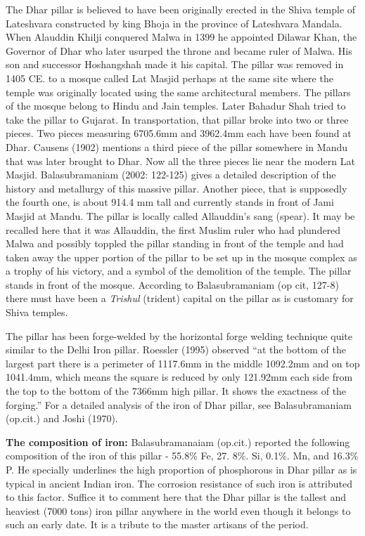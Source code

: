The Dhar pillar is believed to have been originally erected in the Shiva temple of Lateshvara constructed by king Bhoja in the province of Lateshvara Mandala. When Alauddin Khilji conquered Malwa in 1399 he appointed Dilawar Khan, the Governor of Dhar who later usurped the throne and became ruler of Malwa. His son and successor Hoshangshah made it his capital. The pillar was removed in 1405 CE. to a mosque called Lat Masjid perhaps at the same site where the temple was originally located using the same architectural members. The pillars of the mosque belong to Hindu and Jain temples. Later Bahadur Shah tried to take the pillar to Gujarat. In transportation, that pillar broke into two or three pieces. Two pieces measuring 6705.6mm and 3962.4mm each have been found at Dhar. Causens (1902) mentions a third piece of the pillar somewhere in Mandu that was later brought to Dhar. Now all the three pieces lie near the modern Lat Masjid. Balasubramaniam (2002: 122-125) gives a detailed description of the history and metallurgy of this massive pillar. Another piece, that is supposedly the fourth one, is about 914.4 mm tall and currently stands in front of Jami Masjid at Mandu. The pillar is locally called Allauddin's sang (spear). It may be recalled here that it was Allauddin, the first Muslim ruler who had plundered Malwa and possibly toppled the pillar standing in front of the temple and had taken away the upper portion of the pillar to be set up in the mosque complex as a trophy of his victory, and a symbol of the demolition of the temple. The pillar stands in front of the mosque. According to Balasubramaniam (op cit, 127-8) there must have been a {\it Trishul} (trident) capital on the pillar as is customary for Shiva temples. 

The pillar has been forge-welded by the horizontal forge welding technique quite similar to the Delhi Iron pillar. Roessler (1995) observed “at the bottom of the largest part there is a perimeter of 1117.6mm in the middle 1092.2mm and on top 1041.4mm, which means the square is reduced by only 121.92mm each side from the top to the bottom of the 7366mm high pillar. It shows the exactness of the forging.” For a detailed analysis of the iron of Dhar pillar, see Balasubramaniam (op.cit.) and Joshi (1970).

\textbf{The composition of iron:} Balasubramanaiam (op.cit.) reported the following composition of the iron of this pillar - 55.8\% Fe, 27. 8\%. Si, 0.1\%. Mn, and 16.3\% P. He specially underlines the high proportion of phosphorous in Dhar pillar as is typical in ancient Indian iron. The corrosion resistance of such iron is attributed to this factor. Suffice it to comment here that the Dhar pillar is the tallest and heaviest (7000 tons) iron pillar anywhere in the world even though it belongs to such an early date. It is a tribute to the master artisans of the period.

